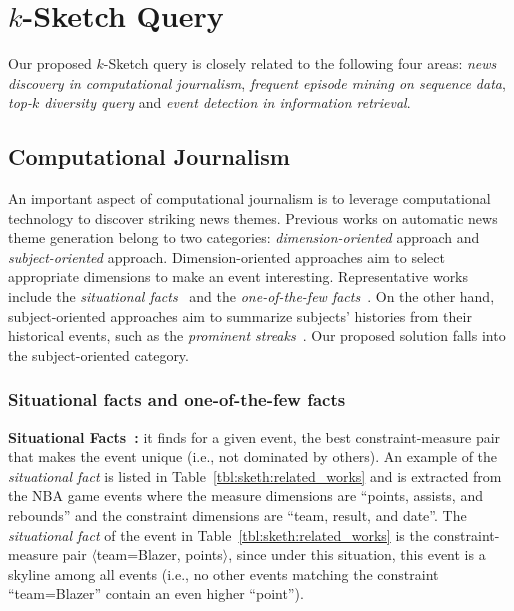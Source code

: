 \section{$k$-Sketch Query}\label{sec:related_work:sketch}
Our proposed $k$-Sketch query is closely related
to the following four areas: 
\emph{news discovery in computational journalism}, 
\emph{frequent episode mining on sequence data}, 
\emph{top-$k$ diversity query} and \emph{event detection in information retrieval}.

\subsection{Computational Journalism}
An important aspect of computational journalism
is to leverage computational technology to discover
striking news themes. 
Previous works on automatic news theme generation belong to two categories: \emph{dimension-oriented} approach and \emph{subject-oriented} approach. Dimension-oriented approaches aim to select appropriate dimensions to make an event interesting. 
Representative works include the \emph{situational facts}~\cite{sultana2014incremental} and the \emph{one-of-the-few facts}~\cite{wu2012one}. On the other hand, subject-oriented approaches aim to
summarize subjects' histories from their historical events, such as the \emph{prominent streaks}~\cite{zhang2014discovering}. Our proposed solution falls into the subject-oriented category. 


\subsubsection{Situational facts and one-of-the-few facts}
\textbf{Situational Facts~\cite{sultana2014incremental}:} it finds for a given event, the best constraint-measure pair that makes the event unique (i.e., not dominated by others). 
An example of the \emph{situational fact} is listed in Table~\ref{tbl:sketh:related_works} and is extracted from the NBA game events where the measure dimensions are ``points, assists, and rebounds'' and the constraint dimensions are ``team, result, and date''. The \emph{situational fact} of the event in Table~\ref{tbl:sketh:related_works} is the constraint-measure pair $\langle$team=Blazer, points$\rangle$, since under
this situation, this event is a skyline among all events (i.e., no other events matching the constraint ``team=Blazer'' contain an even higher ``point'').


